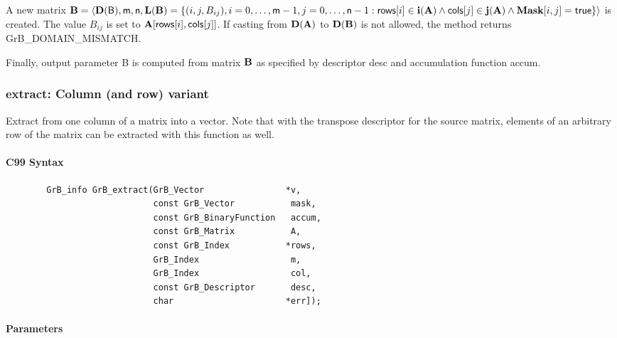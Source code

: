 A new matrix ${\bf B} = \langle \bold{D}({\sf B}),{\sf m},{\sf n},
\bold{L}({\bf B}) = \{ (i,j,B_{ij}), i = 0,\ldots,{\sf m}-1, j = 0, \ldots,{\sf n}-1 : {\sf rows}[i]
\in \bold{i}({\bf A}) \wedge {\sf cols}[j] \in \bold{j}({\bf A}) \wedge {\bf Mask}[i,j] = {\sf true} \} \rangle$
is created.  The value $B_{ij}$ is set to ${\bf A}[{\sf rows}[i],{\sf cols}[j]]$. If
casting from $\bold{D}({\bf A})$ to $\bold{D}({\bf B})$ is not
allowed, the method returns {\sf GrB\_DOMAIN\_MISMATCH}.

Finally, output parameter {\sf B} is computed from matrix ${\bf B}$ as
specified by descriptor {\sf desc} and accumulation function {\sf accum}.

\subsubsection{{\sf extract}: Column (and row) variant}

Extract from one column of a matrix into a vector.  Note that with the transpose
descriptor for the source matrix, elements of an arbitrary row of the matrix
can be extracted with this function as well.

\paragraph{C99 Syntax}

\begin{verbatim}
        GrB_info GrB_extract(GrB_Vector                *v,
                             const GrB_Vector           mask,
                             const GrB_BinaryFunction   accum,
                             const GrB_Matrix           A,
                             const GrB_Index           *rows,
                             GrB_Index                  m,
                             GrB_Index                  col,
                             const GrB_Descriptor       desc,
                             char                      *err]); 
\end{verbatim}

\paragraph{Parameters}

